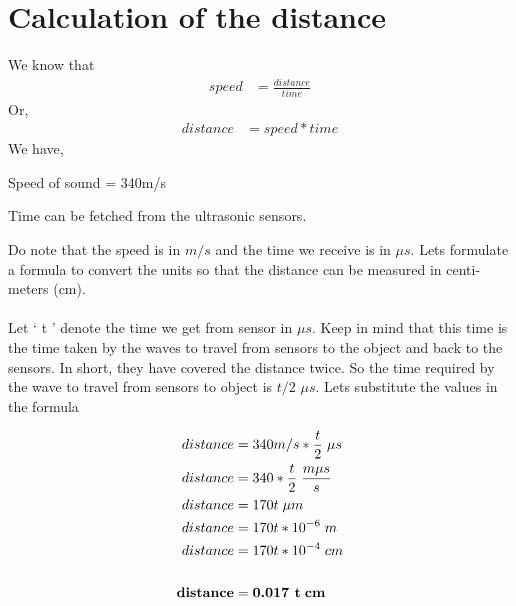 \section{Calculation of the distance}
We know that 
\begin{align*}
    speed &= \frac{distance}{time}
\end{align*}
Or,
\begin{align*}
    distance &= speed * time
\end{align*}  
We have,
\par Speed of sound = 340m/s
\par Time can be fetched from the ultrasonic sensors.

\vspace{0.5cm}
\par Do note that the speed is in $m/s$ and the time we receive is in $\mu s$. Lets formulate a formula to convert the units so that the distance can be measured in centi-meters (cm).

\paragraph{ } Let ‘ t ’ denote the time we get from sensor in $\mu s$. Keep in mind that this time is the time taken by the waves to travel from sensors to the object and back to the sensors. In short, they have covered the distance twice. So the time required by the wave to travel from sensors to object is $t/2$ $\mu s$. Lets substitute the values in the formula

\begin{align*}
    distance &= 340 m/s * \frac{t}{2} \hspace{0.1cm} \mu s \\
    distance &= 340 * \frac{t}{2} \hspace{0.1cm} \frac{m \mu s}{s} \\
    distance &= 170t\hspace{0.1cm} \mu m \\
    distance &= 170t * 10^{-6} \hspace{0.1cm} m \\
    distance &= 170t * 10^{-4} \hspace{0.1cm} cm \\
    \vspace{0.3cm}\\
    \textbf{distance} &= \textbf{0.017 t} \hspace{0.1cm} \textbf{cm}
\end{align*}


